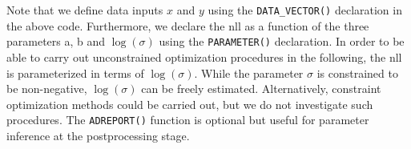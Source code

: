 \documentclass[bimj,fleqn]{w-art}\usepackage[]{graphicx}\usepackage[]{color}
\theoremstyle{plain}
\theoremstyle{definition}
\begin{document}


Note that we define data inputs $x$ and $y$ using the \texttt{DATA\_VECTOR()} declaration in the above code.
Furthermore, we declare the nll as a function of the three parameters a, b and $\log(\sigma)$ using the \texttt{PARAMETER()} declaration.
In order to be able to carry out unconstrained optimization procedures in the following, the nll is parameterized in terms of $\log(\sigma)$.
While the parameter $\sigma$ is constrained to be non-negative, $\log(\sigma)$ can be freely estimated.
Alternatively, constraint optimization methods could be carried out, but we do not investigate such procedures.
The \texttt{ADREPORT()} function is optional but useful for parameter inference at the postprocessing stage.
\end{document}
